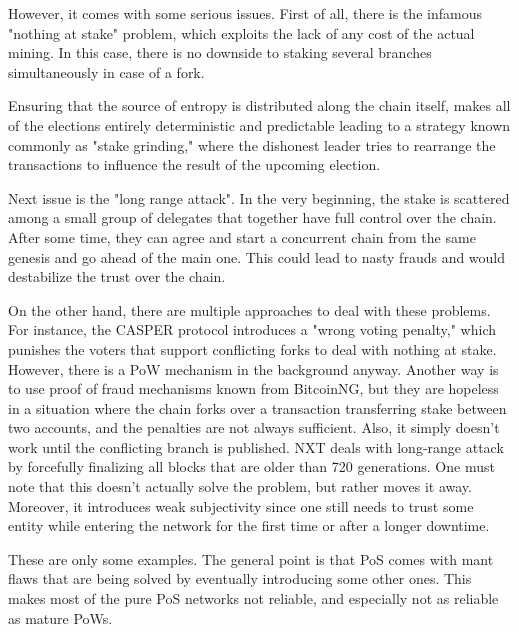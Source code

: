 However, it comes with some serious issues. First of all, there is the infamous "nothing at stake"
\cite{pos_flaws_nothing}
problem, which exploits the lack of any cost of the actual mining. In this case,
there is no downside to staking several branches simultaneously in case of a fork.

Ensuring that the source of entropy is distributed along the chain itself,
makes all of the elections entirely deterministic and predictable leading to a strategy
known commonly as "stake grinding," where the dishonest leader tries to rearrange the
transactions to influence the result of the upcoming election.

Next issue is the "long range attack"\cite{pos_flaws_long}.
In the very beginning, the stake is scattered among a small
group of delegates that together have full control over the chain. After
some time, they can agree and start a concurrent chain from the same genesis
and go ahead of the main one. This could lead to nasty frauds and would
destabilize the trust over the chain.

On the other hand, there are multiple approaches to deal with these problems. For instance,
the CASPER protocol introduces a "wrong voting penalty," which punishes the
voters that support conflicting forks to deal with nothing at stake\cite{casper}.
However, there is a PoW mechanism in the background anyway. Another way is to use
proof of fraud mechanisms known from BitcoinNG\cite{bcng},
but they are hopeless in a situation where the chain forks over a transaction
transferring stake between two accounts, and the penalties are not always
sufficient. Also, it simply doesn't work until the
conflicting branch is published. NXT deals with long-range attack by forcefully
finalizing all blocks that are older than 720 generations\cite{nxt}.
One must note that this doesn't actually solve the problem, but rather moves it
away. Moreover, it introduces weak subjectivity since one still needs to trust
some entity while entering the network for the first time or after a longer downtime.

These are only some examples. The general point is that PoS comes with mant flaws
that are being solved by eventually introducing some other ones. This
makes most of the pure PoS networks not reliable, and especially not as reliable
as mature PoWs.
